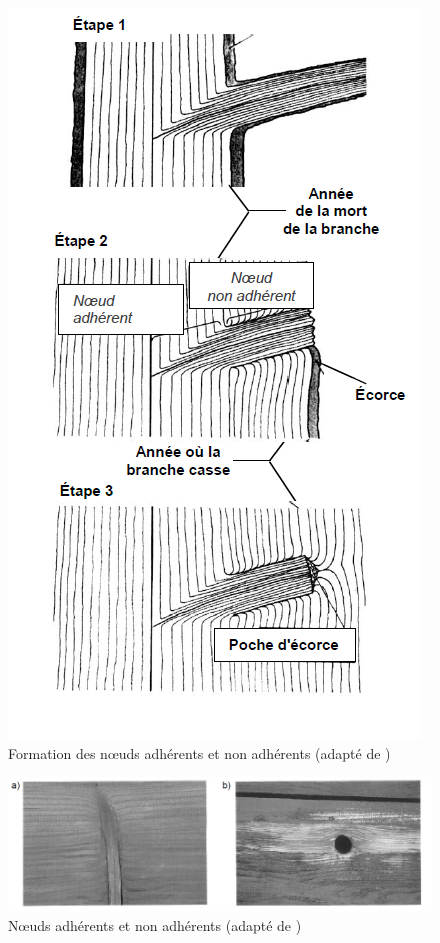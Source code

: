 \begin{figure}[h]
	\centering
	\includegraphics[scale=0.6]{img/ch9_adherents}
	\caption{Formation des nœuds adhérents et non adhérents (adapté de \cite{hoadley1990identifying})}
	\label{fig:adherents}
\end{figure}


\begin{figure}[h]
	\centering
	\includegraphics[scale=0.55]{img/ch9_adherents_photos}
	\caption{Nœuds adhérents et non adhérents (adapté de \cite{hoadley1990identifying})}
	\label{fig:adherents_photos}
\end{figure}

